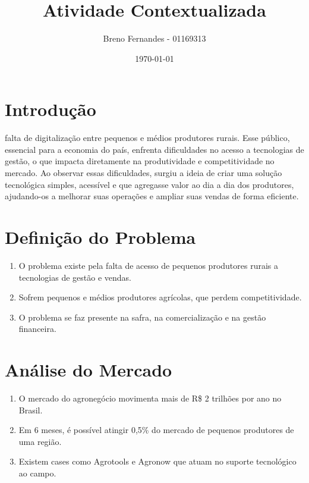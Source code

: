 \documentclass{article}
\begin{document}
\title{Atividade Contextualizada}
\author{Breno Fernandes - 01169313}
\date{\today}
\maketitle

\section*{Introdução}
falta de digitalização entre pequenos e médios produtores rurais. Esse público, essencial para a economia do país, enfrenta dificuldades no acesso a tecnologias de gestão, o que impacta diretamente na produtividade e competitividade no mercado. Ao observar essas dificuldades, surgiu a ideia de criar uma solução tecnológica simples, acessível e que agregasse valor ao dia a dia dos produtores, ajudando-os a melhorar suas operações e ampliar suas vendas de forma eficiente.

\section*{Definição do Problema}
\begin{enumerate}[label=\arabic*.]
    \item O problema existe pela falta de acesso de pequenos produtores rurais a tecnologias de gestão e vendas.
    \item Sofrem pequenos e médios produtores agrícolas, que perdem competitividade.
    \item O problema se faz presente na safra, na comercialização e na gestão financeira.
\end{enumerate}

\section*{Análise do Mercado}
\begin{enumerate}[label=\arabic*.]
    \item O mercado do agronegócio movimenta mais de R\$ 2 trilhões por ano no Brasil.
    \item Em 6 meses, é possível atingir 0,5\% do mercado de pequenos produtores de uma região.
    \item Existem cases como Agrotools e Agronow que atuam no suporte tecnológico ao campo.
\end{enumerate}
\end{document}
